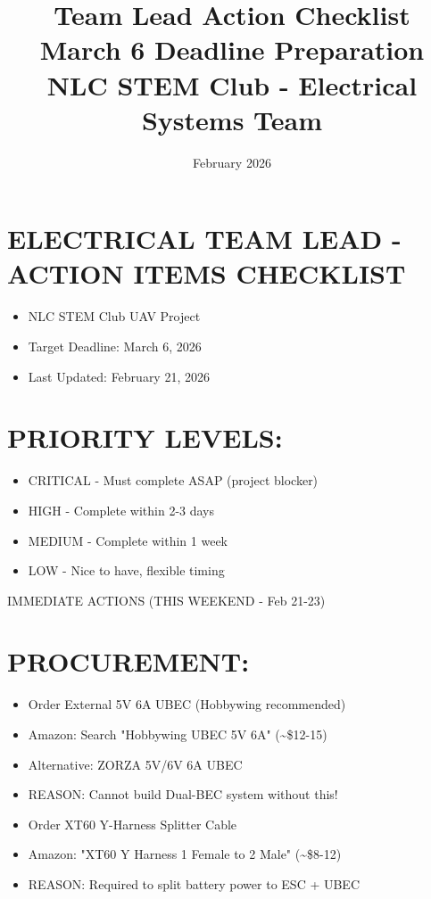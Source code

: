 \documentclass[11pt,letterpaper]{article}
\title{\Huge\textbf{Team Lead Action Checklist}\\
\Large March 6 Deadline Preparation\\
\large NLC STEM Club - Electrical Systems Team}
\author{February 2026}
\date{}
\begin{document}
\maketitle
\thispagestyle{empty}
\newpage
\section{ELECTRICAL TEAM LEAD - ACTION ITEMS CHECKLIST}

\begin{itemize}
  \item NLC STEM Club UAV Project
  \item Target Deadline: March 6, 2026
  \item Last Updated: February 21, 2026
\end{itemize}

\section{PRIORITY LEVELS:}

\begin{itemize}
  \item [CRITICAL] CRITICAL - Must complete ASAP (project blocker)
  \item [WARNING]  HIGH     - Complete within 2-3 days
  \item  MEDIUM   - Complete within 1 week
  \item  LOW      - Nice to have, flexible timing
\end{itemize}

IMMEDIATE ACTIONS (THIS WEEKEND - Feb 21-23)\par

\section{PROCUREMENT:}

\begin{itemize}
  \item [CRITICAL] [ ] Order External 5V 6A UBEC (Hobbywing recommended)
  \item Amazon: Search "Hobbywing UBEC 5V 6A" (\textasciitilde{}\$12-15)
  \item Alternative: ZORZA 5V/6V 6A UBEC
  \item REASON: Cannot build Dual-BEC system without this!
\end{itemize}

\begin{itemize}
  \item [CRITICAL] [ ] Order XT60 Y-Harness Splitter Cable
  \item Amazon: "XT60 Y Harness 1 Female to 2 Male" (\textasciitilde{}\$8-12)
  \item REASON: Required to split battery power to ESC + UBEC
\end{itemize}
\end{document}
